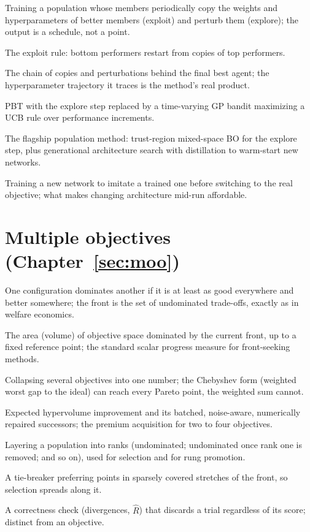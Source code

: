 \begin{description}[leftmargin=1.5em, itemsep=1pt, font=\normalfont\bfseries]
\item[PBT] Training a population whose members periodically copy the
weights and hyperparameters of better members (exploit) and perturb
them (explore); the output is a schedule, not a point.
\item[truncation selection] The exploit rule: bottom performers restart
from copies of top performers.
\item[lineage / schedule] The chain of copies and perturbations behind
the final best agent; the hyperparameter trajectory it traces is the
method's real product.
\item[PB2] PBT with the explore step replaced by a time-varying GP
bandit maximizing a UCB rule over performance increments.
\item[BG-PBT] The flagship population method: trust-region mixed-space
BO for the explore step, plus generational architecture search with
distillation to warm-start new networks.
\item[distillation] Training a new network to imitate a trained one
before switching to the real objective; what makes changing
architecture mid-run affordable.
\end{description}

\section*{Multiple objectives (Chapter~\ref{sec:moo})}

\begin{description}[leftmargin=1.5em, itemsep=1pt, font=\normalfont\bfseries]
\item[dominance / Pareto front] One configuration dominates another if
it is at least as good everywhere and better somewhere; the front is
the set of undominated trade-offs, exactly as in welfare economics.
\item[hypervolume] The area (volume) of objective space dominated by
the current front, up to a fixed reference point; the standard scalar
progress measure for front-seeking methods.
\item[scalarization] Collapsing several objectives into one number;
the Chebyshev form (weighted worst gap to the ideal) can reach every
Pareto point, the weighted sum cannot.
\item[EHVI / qNEHVI / qLogNEHVI] Expected hypervolume improvement and
its batched, noise-aware, numerically repaired successors; the premium
acquisition for two to four objectives.
\item[non-dominated sorting] Layering a population into ranks
(undominated; undominated once rank one is removed; and so on), used
for selection and for rung promotion.
\item[crowding distance] A tie-breaker preferring points in sparsely
covered stretches of the front, so selection spreads along it.
\item[veto gate] A correctness check (divergences, $\widehat{R}$) that
discards a trial regardless of its score; distinct from an objective.
\end{description}

